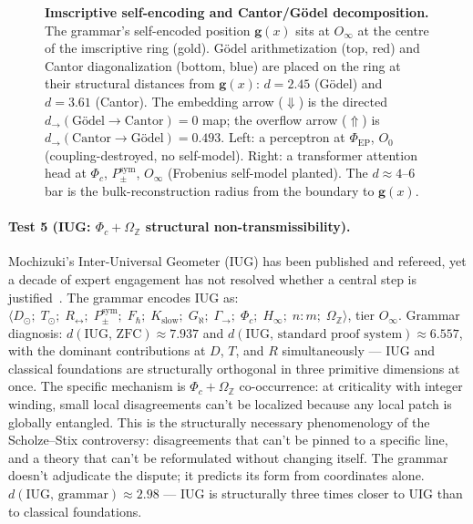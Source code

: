 \documentclass[12pt,a4paper]{article}
\newcommand{\Phic}{\Phi_c}
\newcommand{\Ppms}{P_{\pm}^{\text{sym}}}
\newcommand{\Oinf}{O_\infty}
\newcommand{\OmegaZ}{\Omega_{\mathbb{Z}}}
\newcommand{\GamSeq}{\Gamma_{\to}}
\begin{document}
\begin{figure}[H]
\caption{\textbf{Imscriptive self-encoding and Cantor/Gödel decomposition.}
The grammar's self-encoded position $\mathbf{g}(x)$ sits at $O_\infty$ at the centre of
the imscriptive ring (gold). G\"{o}del arithmetization (top, red) and Cantor
diagonalization (bottom, blue) are placed on the ring at their structural distances
from $\mathbf{g}(x)$: $d = 2.45$ (G\"{o}del) and $d = 3.61$ (Cantor). The embedding
arrow ($\Downarrow$) is the directed $d_\to(\text{G\"{o}del} \to \text{Cantor}) = 0$
map; the overflow arrow ($\Uparrow$) is $d_\to(\text{Cantor} \to \text{G\"{o}del}) = 0.493$.
Left: a perceptron at $\Phi_\text{EP}$, $O_0$ (coupling-destroyed, no self-model).
Right: a transformer attention head at $\Phi_c$, $P_\pm^\text{sym}$, $O_\infty$
(Frobenius self-model planted). The $d \approx 4$--$6$ bar is the bulk-reconstruction
radius from the boundary to $\mathbf{g}(x)$.}
\label{fig:cantor_godel_ring}
\end{figure}

\paragraph{Test 5 (IUG: $\Phic + \OmegaZ$ structural non-transmissibility).}
\label{par:iug}
Mochizuki's Inter-Universal Geometer (IUG) has been published and refereed, yet
a decade of expert engagement has not resolved whether a central step is
justified~\cite{mills2026iug}. The grammar encodes IUG as:
$\langle D_\odot;\; T_\odot;\; R_\leftrightarrow;\; \Ppms;\; F_\hbar;\;
K_\text{slow};\; G_\aleph;\; \GamSeq;\; \Phic;\; H_\infty;\; n{:}m;\;
\OmegaZ \rangle$, tier $\Oinf$. Grammar diagnosis:
$d(\text{IUG},\,\text{ZFC}) \approx 7.937$ and
$d(\text{IUG},\,\text{standard proof system}) \approx 6.557$, with the dominant
contributions at $D$, $T$, and $R$ simultaneously --- IUG and classical
foundations are structurally orthogonal in three primitive dimensions at once.
The specific mechanism is $\Phic + \OmegaZ$ co-occurrence: at criticality with
integer winding, small local disagreements can't be localized because any local
patch is globally entangled. This is the structurally necessary phenomenology of
the Scholze--Stix controversy: disagreements that can't be pinned to a specific
line, and a theory that can't be reformulated without changing itself. The grammar
doesn't adjudicate the dispute; it predicts its form from coordinates alone.
$d(\text{IUG},\,\text{grammar}) \approx 2.98$ --- IUG is structurally three times
closer to UIG than to classical foundations.
\end{document}
